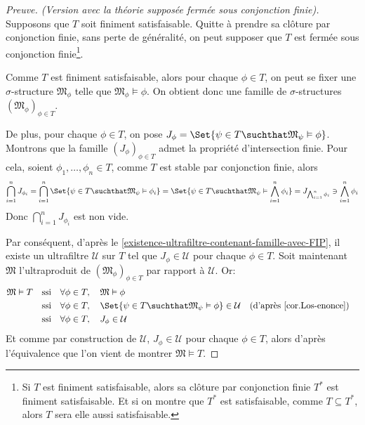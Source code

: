 \begin{proof}[Preuve. (Version avec la théorie supposée fermée sous conjonction finie)]
	Supposons que $T$ soit finiment satisfaisable. Quitte à prendre sa clôture par conjonction finie, sans perte de généralité, on peut supposer que $T$ est fermée sous conjonction finie\footnote{Si $T$ est finiment satisfaisable, alors sa clôture par conjonction finie $T^{*}$ est finiment satisfaisable. Et si on montre que $T^{*}$ est satisfaisable, comme $T\subseteq T^{*}$, alors $T$ sera elle aussi satisfaisable.}.
	
	Comme $T$ est finiment satisfaisable, alors pour chaque $\phi\in T$, on peut se fixer une $\sigma$-structure $\mathfrak{M}_{\phi}$ telle que $\mathfrak{M}_{\phi}\vDash\phi$. On obtient donc une famille de $\sigma$-structures $\left(\mathfrak{M}_{\phi}\right)_{\phi\in T}$.
	
	De plus, pour chaque $\phi\in T$, on pose $J_{\phi}=\Set{\psi\in T\suchthat\mathfrak{M}_{\psi}\vDash\phi}$. Montrons que la famille $\left(J_{\phi}\right)_{\phi\in T}$ admet la propriété d'intersection finie. Pour cela, soient $\phi_{1},\dots,\phi_{n}\in T$, comme $T$ est stable par conjonction finie, alors
	\[
		\bigcap_{i=1}^{n}J_{\phi_{i}}=\bigcap_{i=1}^{n}\Set{\psi\in T\suchthat\mathfrak{M}_{\psi}\vDash\phi_{i}}=\Set{\psi\in T\suchthat \mathfrak{M}_{\psi}\vDash\bigwedge_{i=1}^{n}\phi_{i}}=J_{\bigwedge_{i=1}^{n}\phi_{i}}\ni\bigwedge_{i=1}^{n}\phi_{i}\]
	Donc $\bigcap_{i=1}^{n}J_{\phi_{i}}$ est non vide.
	
	Par conséquent, d'après le \cref{existence-ultrafiltre-contenant-famille-avec-FIP}, il existe un ultrafiltre $\mathcal{U}$ sur $T$ tel que $J_{\phi}\in\mathcal{U}$ pour chaque $\phi\in T$. Soit maintenant $\mathfrak{M}$ l'ultraproduit de $\left(\mathfrak{M}_{\phi}\right)_{\phi\in T}$ par rapport à $\mathcal{U}$. Or:
	\begin{align*}
		\mathfrak{M}\vDash T
		\quad&\text{ssi}\quad\forall\phi\in T,\quad\mathfrak{M}\vDash\phi\\
		\quad&\text{ssi}\quad\forall\phi\in T,\quad\Set{\psi\in T\suchthat\mathfrak{M}_{\psi}\vDash\phi}\in\mathcal{U}&&\text{(d'après \cref{cor.Los-enonce})}\\
		\quad&\text{ssi}\quad\forall\phi\in T,\quad J_{\phi}\in\mathcal{U}
	\end{align*}
	Et comme par construction de $\mathcal{U}$, $J_{\phi}\in\mathcal{U}$ pour chaque $\phi\in T$, alors d'après l'équivalence que l'on vient de montrer $\mathfrak{M}\vDash T$.
\end{proof}


